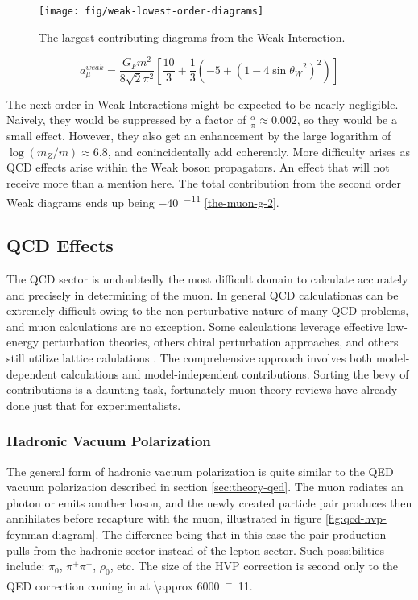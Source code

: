 \begin{figure}
\label{fig:weak-lowest-order-diagrams}
\texttt{[image: fig/weak-lowest-order-diagrams]}
\caption{The largest contributing diagrams from the Weak Interaction.}
\end{figure}

\begin{equation}
\label{eqn:weak-lowest-order}
a_\mu^{weak} = \frac{G_F m^2}{8\sqrt{2}\pi^2} [\frac{10}{3} + \frac{1}{3}(-5 + (1 - 4\sin{\theta_W}^2)^2)]
\end{equation}

The next order in Weak Interactions might be expected to be nearly negligible.  Naively, they would be suppressed by a factor of $\frac{\alpha}{\pi} \approx 0.002$, so they would be a small effect.  However, they also get an enhancement by the large logarithm of $\log(m_Z/m) \approx 6.8$, and conincidentally add coherently.  More difficulty arises as QCD effects arise within the Weak boson propagators.  An effect that will not receive more than a mention here.  The total contribution from the second order Weak diagrams ends up being \SI{-40}{^{-11}} \ref{the-muon-g-2}.

\subsection{QCD Effects} \label{sec:theory-qcd}

The QCD sector is undoubtedly the most difficult domain to calculate accurately and precisely in determining \gmtwo of the muon.  In general QCD calculationas can be extremely difficult owing to the non-perturbative nature of many QCD problems, and muon \gmtwo calculations are no exception.  Some calculations leverage effective low-energy perturbation theories, others chiral perturbation approaches, and others still utilize lattice calulations .  The comprehensive approach involves both model-dependent calculations and model-independent contributions.  Sorting the bevy of contributions is a daunting task, fortunately muon \gmtwo theory reviews have already done just that for experimentalists.

\subsubsection{Hadronic Vacuum Polarization}

The general form of hadronic vacuum polarization is quite similar to the QED vacuum polarization described in section \ref{sec:theory-qed}.  The muon radiates an photon or emits another boson, and the newly created particle pair produces then annihilates before recapture with the muon, illustrated in figure \ref{fig:qcd-hvp-feynman-diagram}.  The difference being that in this case the pair production pulls from the hadronic sector instead of the lepton sector.  Such possibilities include: $\pi_0$, $\pi^+\pi^-$, $\rho_0$, etc.  The size of the HVP correction is second only to the QED correction coming in at \SI{\approx 6000}{^-11}.  


